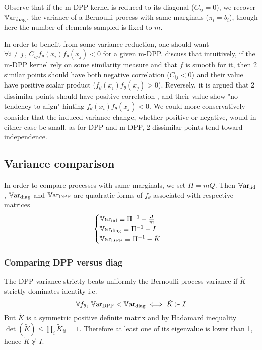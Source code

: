 Observe that if the m-DPP kernel is reduced to its diagonal ($C_{ij} = 0$), we recover $\operatorname{\mathbb V ar}_{\textrm{diag}}$, the variance of a Bernoulli process with same marginals ($\pi_i = b_i$), though here the number of elements sampled is fixed to $m$.

In order to benefit from some variance reduction, one should want $\forall i\neq j \,,\, C_{ij}f_\theta(x_i) f_\theta(x_j) <0$ for a given m-DPP.
\cite{zhang2017dppminibatch} discuss that intuitively, if the m-DPP kernel rely on some similarity measure and that $f$ is smooth for it, then 2 similar points should have both negative correlation ($C_{ij}<0$) and their value have positive scalar product ($f_\theta(x_i) f_\theta(x_j) > 0$). Reversely, it is argued that 2 dissimilar points should have positive correlation 
, and their value show "no tendency to align" hinting $f_\theta(x_i) f_\theta(x_j) < 0$. We could more conservatively consider that the induced variance change, whether positive or negative, would in either case be small, as for DPP and m-DPP, 2 dissimilar points tend toward independence.




\subsection{Variance comparison}
In order to compare processes with same marginals, we set $\Pi = mQ$. Then $\operatorname{\mathbb V ar}_{\textrm{iid}}$, $\operatorname{\mathbb V ar}_{\textrm{diag}}$ and $\operatorname{\mathbb V ar}_{\textrm{DPP}}$ are quadratic forms of $f_\theta$ associated with respective matrices
$$\begin{cases}
	\operatorname{\mathbb V ar}_{\textrm{iid}} \equiv \Pi^{-1} - \frac{\boldsymbol{J}}{m} \\
	\operatorname{\mathbb V ar}_{\textrm{diag}} \equiv \Pi^{-1} - I \\
	\operatorname{\mathbb V ar}_{\textrm{DPP}} \equiv \Pi^{-1} - \tilde K
\end{cases}$$

\subsubsection{Comparing DPP versus diag}
The DPP variance strictly beats uniformly the Bernoulli process variance if $\tilde K$ strictly dominates identity i.e. 
\begin{equation}
	\forall f_\theta, \, \operatorname{\mathbb V ar}_{\textrm{DPP}} < \operatorname{\mathbb V ar}_{\textrm{diag}} \iff \tilde K \succ I
\end{equation}
But $\tilde K$ is a symmetric positive definite matrix and by Hadamard inequality $\det( \tilde K) \leq \prod_{i} \tilde K_{ii}= 1$. Therefore at least one of its eigenvalue is lower than 1, hence $\tilde K \nsucc I$.


